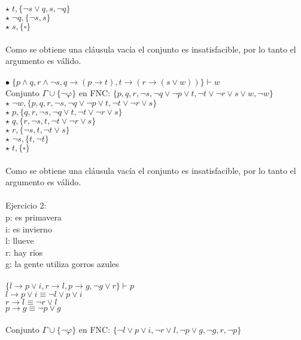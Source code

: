 \documentclass{article}
\begin{document}
$\star \; t, \{\neg s \lor q, s, \neg q\}$\\
$\star \; \neg q, \{\neg s, s\}$\\
$\star \; s, \{ \square \}$\\ \ \\
Como se obtiene una cláusula vacía el conjunto es insatisfacible, por lo tanto el argumento es válido.\\ \ \\
$\bullet \; \{p \land q, r \land \neg s, q \rightarrow (p \rightarrow t), t \rightarrow (r \rightarrow (s \lor w))\} \vdash w$\\
Conjunto $\Gamma \cup \{\neg \varphi \}$ en FNC: $\{p,q,r,\neg s,\neg q \lor \neg p \lor t, \neg t \lor \neg r \lor s \lor w, \neg w\}$\\
$\star \; \neg w, \{p,q,r,\neg s,\neg q \lor \neg p \lor t, \neg t \lor \neg r \lor s\}$\\
$\star \; p, \{q,r,\neg s,\neg q \lor t, \neg t \lor \neg r \lor s\}$\\
$\star \; q, \{r, \neg s, t, \neg t \lor \neg r \lor s\}$\\
$\star \; r, \{\neg s,t,\neg t \lor s\}$\\
$\star \; \neg s, \{t,\neg t\}$\\
$\star \; t, \{\square\}$\\ \ \\
Como se obtiene una cláusula vacía el conjunto es insatisfacible, por lo tanto el argumento es válido.\\ \ \\
Ejercicio 2:\\
p: es primavera\\
i: es invierno\\
l: llueve\\
r: hay ríos\\
g: la gente utiliza gorros azules\\ \ \\
$\{l \rightarrow p \lor i,r \rightarrow l, p \rightarrow g, \neg g \lor r\} \vdash p$\\
$l \rightarrow p \lor i \equiv \neg l \lor p \lor i$\\
$r \rightarrow l \equiv \neg r \lor l$\\
$p \rightarrow g \equiv \neg p \lor g$\\ \ \\
Conjunto $\Gamma \cup \{\neg \varphi \}$ en FNC: $\{\neg l \lor p \lor i, \neg r \lor l, \neg p \lor g, \neg g, r, \neg p\}$ \\ \ \\
\end{document}
